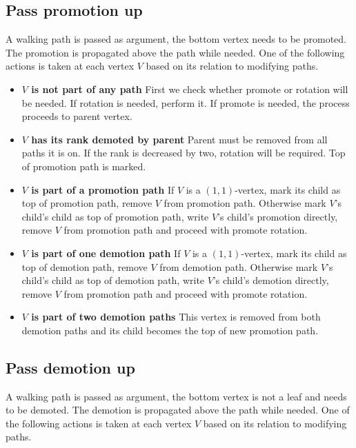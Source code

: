 \subsection{Pass promotion up}

A walking path is passed as argument, the bottom vertex needs to be promoted. The promotion is propagated above the path while needed. One of the following actions is taken at each vertex $V$ based on its relation to modifying paths.

\begin{itemize}

\item {\bfseries $V$ is not part of any path} First we check whether promote or rotation will be needed. If rotation is needed, perform it. If promote is needed, the process proceeds to parent vertex.

\item {\bfseries $V$ has its rank demoted by parent} Parent must be removed from all paths it is on. If the rank is decreased by two, rotation will be required. Top of promotion path is marked.

\item {\bfseries $V$ is part of a promotion path} If $V$ is a $(1,1)$-vertex, mark its child as top of promotion path, remove $V$ from promotion path. Otherwise mark $V$'s child's child as top of promotion path, write $V$'s child's promotion directly, remove $V$ from promotion path and proceed with promote rotation. 

\item {\bfseries $V$ is part of one demotion path} If $V$ is a $(1,1)$-vertex, mark its child as top of demotion path, remove $V$ from demotion path. Otherwise mark $V$'s child's child as top of demotion path, write $V$'s child's demotion directly, remove $V$ from promotion path and proceed with promote rotation.

\item {\bfseries $V$ is part of two demotion paths} This vertex is removed from both demotion paths and its child becomes the top of new promotion path.

\end{itemize}

\subsection{Pass demotion up}

A walking path is passed as argument, the bottom vertex is not a leaf and needs to be demoted. The demotion is propagated above the path while needed. One of the following actions is taken at each vertex $V$ based on its relation to modifying paths.

